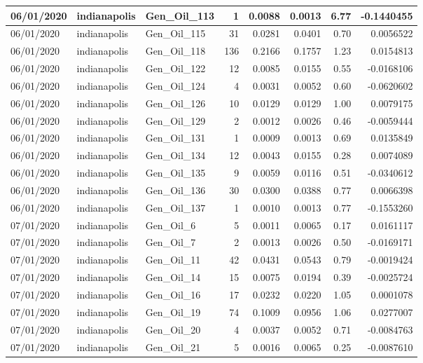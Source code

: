 \documentclass[
  letterpaper,
  DIV=11,
  numbers=noendperiod]{scrartcl}
\begin{document}
\begin{tabular}{l|l|l|r|r|r|r|r}
\hline
06/01/2020 & indianapolis & Gen\_Oil\_113 & 1 & 0.0088 & 0.0013 & 6.77 & -0.1440455\\
\hline
06/01/2020 & indianapolis & Gen\_Oil\_115 & 31 & 0.0281 & 0.0401 & 0.70 & 0.0056522\\
\hline
06/01/2020 & indianapolis & Gen\_Oil\_118 & 136 & 0.2166 & 0.1757 & 1.23 & 0.0154813\\
\hline
06/01/2020 & indianapolis & Gen\_Oil\_122 & 12 & 0.0085 & 0.0155 & 0.55 & -0.0168106\\
\hline
06/01/2020 & indianapolis & Gen\_Oil\_124 & 4 & 0.0031 & 0.0052 & 0.60 & -0.0620602\\
\hline
06/01/2020 & indianapolis & Gen\_Oil\_126 & 10 & 0.0129 & 0.0129 & 1.00 & 0.0079175\\
\hline
06/01/2020 & indianapolis & Gen\_Oil\_129 & 2 & 0.0012 & 0.0026 & 0.46 & -0.0059444\\
\hline
06/01/2020 & indianapolis & Gen\_Oil\_131 & 1 & 0.0009 & 0.0013 & 0.69 & 0.0135849\\
\hline
06/01/2020 & indianapolis & Gen\_Oil\_134 & 12 & 0.0043 & 0.0155 & 0.28 & 0.0074089\\
\hline
06/01/2020 & indianapolis & Gen\_Oil\_135 & 9 & 0.0059 & 0.0116 & 0.51 & -0.0340612\\
\hline
06/01/2020 & indianapolis & Gen\_Oil\_136 & 30 & 0.0300 & 0.0388 & 0.77 & 0.0066398\\
\hline
06/01/2020 & indianapolis & Gen\_Oil\_137 & 1 & 0.0010 & 0.0013 & 0.77 & -0.1553260\\
\hline
07/01/2020 & indianapolis & Gen\_Oil\_6 & 5 & 0.0011 & 0.0065 & 0.17 & 0.0161117\\
\hline
07/01/2020 & indianapolis & Gen\_Oil\_7 & 2 & 0.0013 & 0.0026 & 0.50 & -0.0169171\\
\hline
07/01/2020 & indianapolis & Gen\_Oil\_11 & 42 & 0.0431 & 0.0543 & 0.79 & -0.0019424\\
\hline
07/01/2020 & indianapolis & Gen\_Oil\_14 & 15 & 0.0075 & 0.0194 & 0.39 & -0.0025724\\
\hline
07/01/2020 & indianapolis & Gen\_Oil\_16 & 17 & 0.0232 & 0.0220 & 1.05 & 0.0001078\\
\hline
07/01/2020 & indianapolis & Gen\_Oil\_19 & 74 & 0.1009 & 0.0956 & 1.06 & 0.0277007\\
\hline
07/01/2020 & indianapolis & Gen\_Oil\_20 & 4 & 0.0037 & 0.0052 & 0.71 & -0.0084763\\
\hline
07/01/2020 & indianapolis & Gen\_Oil\_21 & 5 & 0.0016 & 0.0065 & 0.25 & -0.0087610\\

\end{tabular}
\end{document}
